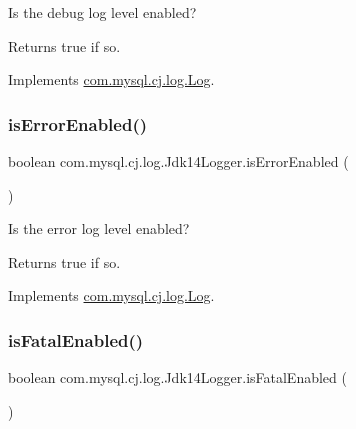 Is the \textquotesingle{}debug\textquotesingle{} log level enabled?

\begin{DoxyReturn}{Returns}
true if so. 
\end{DoxyReturn}


Implements \mbox{\hyperlink{interfacecom_1_1mysql_1_1cj_1_1log_1_1_log_a8340f13152932af117ec2f5884c06dd3}{com.\+mysql.\+cj.\+log.\+Log}}.

\mbox{\label{classcom_1_1mysql_1_1cj_1_1log_1_1_jdk14_logger_ae42f076b115e190b2c7bb186493ea171}} 
\subsubsection{\texorpdfstring{is\+Error\+Enabled()}{isErrorEnabled()}}
{\footnotesize\ttfamily boolean com.\+mysql.\+cj.\+log.\+Jdk14\+Logger.\+is\+Error\+Enabled (\begin{DoxyParamCaption}{ }\end{DoxyParamCaption})}

Is the \textquotesingle{}error\textquotesingle{} log level enabled?

\begin{DoxyReturn}{Returns}
true if so. 
\end{DoxyReturn}


Implements \mbox{\hyperlink{interfacecom_1_1mysql_1_1cj_1_1log_1_1_log_abda4b698026fdb26c74b211b521628c9}{com.\+mysql.\+cj.\+log.\+Log}}.

\mbox{\label{classcom_1_1mysql_1_1cj_1_1log_1_1_jdk14_logger_af740a8480a6f4332aca8118b1143f311}} 
\subsubsection{\texorpdfstring{is\+Fatal\+Enabled()}{isFatalEnabled()}}
{\footnotesize\ttfamily boolean com.\+mysql.\+cj.\+log.\+Jdk14\+Logger.\+is\+Fatal\+Enabled (\begin{DoxyParamCaption}{ }\end{DoxyParamCaption})}


